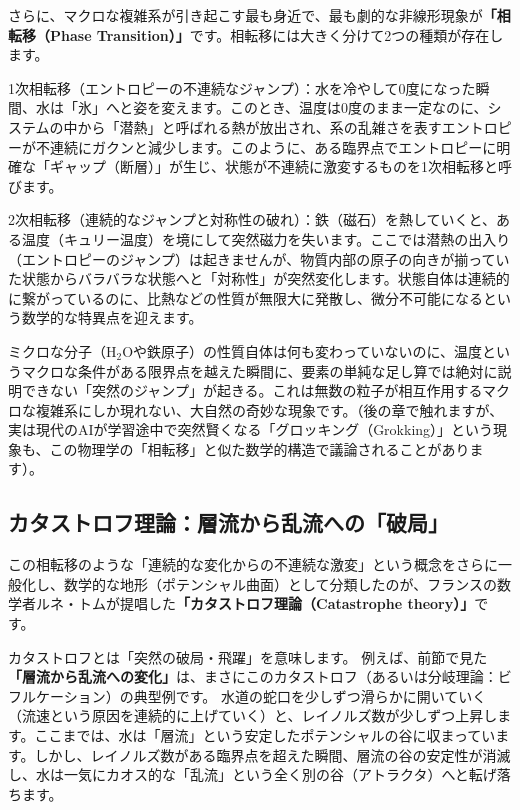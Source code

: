 さらに、マクロな複雑系が引き起こす最も身近で、最も劇的な非線形現象が\textbf{「相転移（Phase Transition）」}です。相転移には大きく分けて2つの種類が存在します。

1次相転移（エントロピーの不連続なジャンプ）：水を冷やして0度になった瞬間、水は「氷」へと姿を変えます。このとき、温度は0度のまま一定なのに、システムの中から「潜熱」と呼ばれる熱が放出され、系の乱雑さを表すエントロピーが不連続にガクンと減少します。このように、ある臨界点でエントロピーに明確な「ギャップ（断層）」が生じ、状態が不連続に激変するものを1次相転移と呼びます。

2次相転移（連続的なジャンプと対称性の破れ）：鉄（磁石）を熱していくと、ある温度（キュリー温度）を境にして突然磁力を失います。ここでは潜熱の出入り（エントロピーのジャンプ）は起きませんが、物質内部の原子の向きが揃っていた状態からバラバラな状態へと「対称性」が突然変化します。状態自体は連続的に繋がっているのに、比熱などの性質が無限大に発散し、微分不可能になるという数学的な特異点を迎えます。

ミクロな分子（H\(_2\)Oや鉄原子）の性質自体は何も変わっていないのに、温度というマクロな条件がある限界点を越えた瞬間に、要素の単純な足し算では絶対に説明できない「突然のジャンプ」が起きる。これは無数の粒子が相互作用するマクロな複雑系にしか現れない、大自然の奇妙な現象です。（後の章で触れますが、実は現代のAIが学習途中で突然賢くなる「グロッキング（Grokking）」という現象も、この物理学の「相転移」と似た数学的構造で議論されることがあります）。

\subsection{カタストロフ理論：層流から乱流への「破局」}

この相転移のような「連続的な変化からの不連続な激変」という概念をさらに一般化し、数学的な地形（ポテンシャル曲面）として分類したのが、フランスの数学者ルネ・トムが提唱した\textbf{「カタストロフ理論（Catastrophe theory）」}です。

カタストロフとは「突然の破局・飛躍」を意味します。 例えば、前節で見た\textbf{「層流から乱流への変化」}は、まさにこのカタストロフ（あるいは分岐理論：ビフルケーション）の典型例です。 水道の蛇口を少しずつ滑らかに開いていく（流速という原因を連続的に上げていく）と、レイノルズ数が少しずつ上昇します。ここまでは、水は「層流」という安定したポテンシャルの谷に収まっています。しかし、レイノルズ数がある臨界点を超えた瞬間、層流の谷の安定性が消滅し、水は一気にカオス的な「乱流」という全く別の谷（アトラクタ）へと転げ落ちます。

